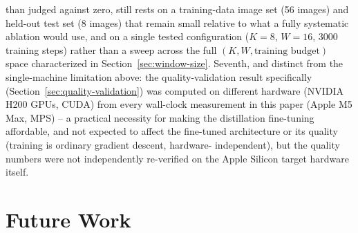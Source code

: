 \documentclass[11pt]{article}
\begin{document}
than judged against zero, still rests on a training-data image set (56 images) and held-out test
set (8 images) that remain small relative to what a fully systematic ablation would use, and on a
single tested configuration ($K=8$, $W=16$, 3000 training steps) rather than a sweep across the
full $(K, W, \text{training budget})$ space characterized in Section~\ref{sec:window-size}.
Seventh, and distinct from the single-machine limitation above: the quality-validation result
specifically (Section~\ref{sec:quality-validation}) was computed on different hardware (NVIDIA
H200 GPUs, CUDA) from every wall-clock measurement in this paper (Apple M5 Max, MPS) -- a
practical necessity for making the distillation fine-tuning affordable, and not expected to affect
the fine-tuned architecture or its quality (training is ordinary gradient descent, hardware-
independent), but the quality numbers were not independently re-verified on the Apple Silicon
target hardware itself.

\section{Future Work}
\end{document}
